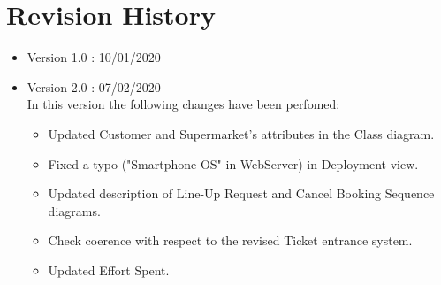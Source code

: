 \section{Revision History}

\begin{itemize}
	\item Version 1.0 : 10/01/2020
	\item Version 2.0 : 07/02/2020 \\
              In this version the following changes have been perfomed:
			\begin{itemize}
				\item Updated Customer and Supermarket's attributes in the Class diagram.
				\item Fixed a typo ("Smartphone OS" in WebServer) in Deployment view.
				\item Updated description of Line-Up Request and Cancel Booking Sequence diagrams.
				\item Check coerence with respect to the revised Ticket entrance system.
				\item Updated Effort Spent.
			
			\end{itemize}

\end{itemize}